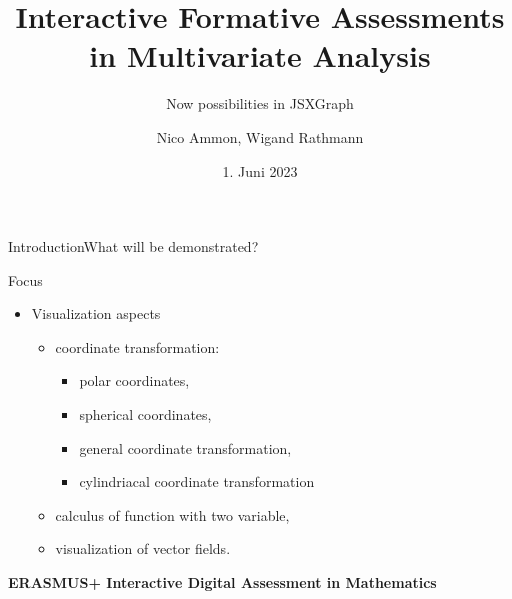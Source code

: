 \documentclass[final]{beamer}
\title[Multivariate Analysis]{Interactive Formative Assessments in Multivariate Analysis}
\subtitle{Now possibilities in JSXGraph}
\author[Ammon, Rathmann]{Nico Ammon, Wigand Rathmann}
\institute[FAU]{Friedrich-Alexander Universit\"{a}t Erlangen-N\"{u}rnberg, Department of Data Science}
\date{1. Juni 2023}
\begin{document}
\begin{trueplainframe}{}
\titlepage%
\end{trueplainframe}

\begin{frame}[t]{Introduction}{What will be demonstrated?}

\begin{block}{Focus}
\begin{itemize}
\item Visualization aspects 
    \begin{itemize}
    \item coordinate transformation:

    \begin{itemize}
    \item    polar coordinates,
    \item    spherical coordinates,
    \item    general coordinate transformation,
    \item    cylindriacal coordinate transformation
    \end{itemize}
    \item calculus of function with two variable,
    \item visualization of vector fields.
    \end{itemize}
    \end{itemize}
\end{block}
\vfill

\centerline{\textbf{ERASMUS+ Interactive Digital Assessment in Mathematics}}

\vfill

    \end{frame}





\begin{frame} [t]{}

\end{frame}
\end{document}
